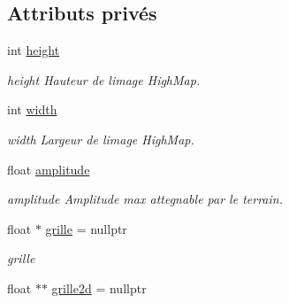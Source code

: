 \subsection*{Attributs privés}
\begin{DoxyCompactItemize}
\item 
\hypertarget{class_terrain_tab_a8213ff78ba0bae26a3ca0391166a5128}{}int \hyperlink{class_terrain_tab_a8213ff78ba0bae26a3ca0391166a5128}{height}\label{class_terrain_tab_a8213ff78ba0bae26a3ca0391166a5128}

\begin{DoxyCompactList}\small\item\em height Hauteur de l\textquotesingle{}image High\+Map. \end{DoxyCompactList}\item 
\hypertarget{class_terrain_tab_a4cfde4817009ea768a1c071c00c2f1fd}{}int \hyperlink{class_terrain_tab_a4cfde4817009ea768a1c071c00c2f1fd}{width}\label{class_terrain_tab_a4cfde4817009ea768a1c071c00c2f1fd}

\begin{DoxyCompactList}\small\item\em width Largeur de l\textquotesingle{}image High\+Map. \end{DoxyCompactList}\item 
\hypertarget{class_terrain_tab_a46e3284a38c404d326323091628abf03}{}float \hyperlink{class_terrain_tab_a46e3284a38c404d326323091628abf03}{amplitude}\label{class_terrain_tab_a46e3284a38c404d326323091628abf03}

\begin{DoxyCompactList}\small\item\em amplitude Amplitude max attegnable par le terrain. \end{DoxyCompactList}\item 
\hypertarget{class_terrain_tab_a0b095b4aeb69aa00a75d543cd726e608}{}float $\ast$ \hyperlink{class_terrain_tab_a0b095b4aeb69aa00a75d543cd726e608}{grille} = nullptr\label{class_terrain_tab_a0b095b4aeb69aa00a75d543cd726e608}

\begin{DoxyCompactList}\small\item\em grille \end{DoxyCompactList}\item 
\hypertarget{class_terrain_tab_ace8f6807c917c7c186cf688e2c286f10}{}float $\ast$$\ast$ \hyperlink{class_terrain_tab_ace8f6807c917c7c186cf688e2c286f10}{grille2d} = nullptr\label{class_terrain_tab_ace8f6807c917c7c186cf688e2c286f10}


\end{DoxyCompactItemize}
